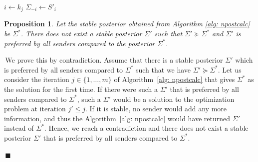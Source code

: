 \documentclass[12pt,journal,onecolumn]{IEEEtran}
\newtheorem{remark}{Remark}
\newtheorem{prop}{{Proposition}}
\newenvironment{Proof}[1]{\medskip\par\noindent{\bf Proof:\,}\,#1}{{\mbox{\,$\blacksquare$}\par}}
\newcommand{\rknote}[1]{\noindent{\leavevmode\color{red}[Raj -- #1]}}
\begin{document}
\begin{algorithm}[t]
\caption{Finding an Equilibrium Posterior for the $m$-Sender Game via SDP}\label{alg: npostcalc}
\begin{algorithmic}[1]
\State $i \gets k_j$
\State $ \Sigma_{-i} \gets S'_{i}$
\EndFor
{}
\end{algorithmic}
\end{algorithm}

\begin{prop}\label{Remark_3_alt}
Let the stable posterior obtained from Algorithm \ref{alg: npostcalc} be $\Sigma^*$. There does not exist a stable posterior $\Sigma'$ such that $ \Sigma' \succeq \Sigma^* $ and $\Sigma'$ is preferred by all senders compared to the posterior $\Sigma^*$.
\end{prop}
\begin{Proof}
We prove this by contradiction. Assume that there is a stable posterior $\Sigma'$ which is preferred by all senders compared to $\Sigma^*$ such that we have $\Sigma' \succeq \Sigma^*$. Let us consider the iteration $j\in \{1,\dots,m\}$ of Algorithm~\ref{alg: npostcalc} that gives $\Sigma^*$ as the solution for the first time. If there were such a $\Sigma'$ that is preferred by all senders compared to $\Sigma^*$, such a $\Sigma'$ would be a solution to the optimization problem at iteration $j'\leq j$. If it is stable, no sender would add any more information, and thus the Algorithm~\ref{alg: npostcalc} would have returned $\Sigma'$ instead of $\Sigma^*$. Hence, we reach a contradiction and there does not exist a stable posterior $\Sigma'$ that is preferred by all senders compared to $\Sigma^*$.
\end{Proof}
\end{document}
